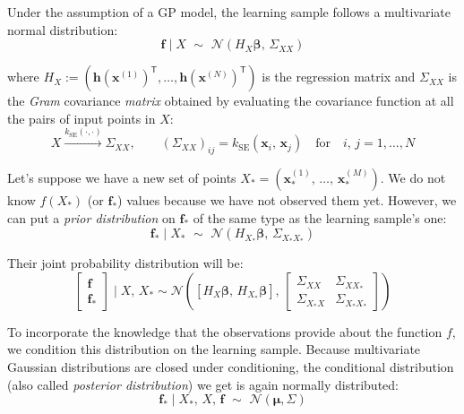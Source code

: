\vspace{0.2cm}
Under the assumption of a GP model, the learning sample follows a multivariate normal distribution:
\begin{equation}
    \mathbf{f}\;\vert\; X \,\,\sim\,\, \mathcal{N}(H_{X}\boldsymbol{\beta},\,\Sigma_{XX})
\end{equation}

\noindent
where $H_{X}:=(\mathbf{h}(\mathbf{x}^{(1)})^\mathsf{T},\dots,\mathbf{h}(\mathbf{x}^{(N)})^\mathsf{T})$ is the regression matrix and $\Sigma_{XX}$ is the \textit{Gram} covariance \textit{matrix} obtained by evaluating the covariance function at all the pairs of input points in $X$:
\begin{equation}
    X\xrightarrow{k_{\text{SE}}(\cdot,\cdot)}\Sigma_{XX},\qquad \left(\Sigma_{XX}\right)_{ij} = k_{\text{SE}}(\mathbf{x}_i,\,\mathbf{x}_j)\quad\text{for}\quad i,\,j=1,\dots,N
\end{equation}

\noindent
Let's suppose we have a new set of points $X_{*}=(\mathbf{x}_{*}^{(1)},\,\dots,\,\mathbf{x}_{*}^{(M)})$. We do not know $f(X_{*})$ (or $\mathbf{f}_{*}$) values because we have not observed them yet. However, we can put a \textit{prior distribution} on $\mathbf{f}_{*}$ of the same type as the learning sample's one:
\begin{equation}
    \mathbf{f}_{*}\;\vert\; X_{*} \,\,\sim\,\, \mathcal{N}(H_{X_{*}}\boldsymbol{\beta},\,\Sigma_{X_{*}X_{*}})
\end{equation}

\noindent
Their joint probability distribution will be:
\begin{equation}
    \begin{bmatrix}
    \mathbf{f} \\ \mathbf{f}_{*}
    \end{bmatrix}\;\vert\; X,\,X_{*} \sim \mathcal{N}\left([H_{X}\boldsymbol{\beta},\,H_{X_{*}}\boldsymbol{\beta}],\,\begin{bmatrix}
    \Sigma_{XX} & \Sigma_{XX_{*}} \\
    \Sigma_{X_{*}X} & \Sigma_{X_{*}X_{*}}
    \end{bmatrix}
    \right)
\end{equation}

\noindent
To incorporate the knowledge that the observations provide about the function $f$, we condition this distribution on the learning sample. Because multivariate Gaussian distributions are closed under conditioning, the conditional distribution (also called \textit{posterior distribution}) we get is again normally distributed:
%
\begin{equation}
    \mathbf{f}_{*}\;\vert\; X_{*},\,X,\,\mathbf{f}\,\,\sim\,\,\mathcal{N}(\boldsymbol{\mu},\Sigma)
\end{equation}
    
